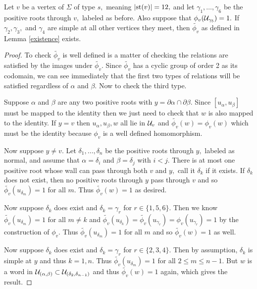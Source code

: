 \documentclass[class=book, crop=false]{standalone}
\begin{document}
	\begin{lemma} Let $v$ be a vertex of $\Sigma$ of type $s,$ meaning $|\mathrm{st}(v)|=12,$ and let $\gamma_1,\dots,\gamma_6$ be the positive roots through $v,$ labeled as before. Also suppose that $\phi_v(\mathcal{U}_{\gamma_5})=1.$ If $\gamma_2,\gamma_3,$ and $\gamma_4$ are simple at all other vertices they meet, then $\tilde{\phi_v}$ as defined in Lemma \ref{existence} exists.
	\label{336f2existence}
\end{lemma}
\begin{proof}
	To check $\tilde{\phi_v}$ is well defined is a matter of checking the relations are satisfied by the images under $\tilde{\phi_v}.$ Since $\tilde{\phi_v}$ has a cyclic group of order 2 as its codomain, we can see immediately that the first two types of relations will be satisfied regardless of $\alpha$ and $\beta.$ Now to check the third type.

	Suppose $\alpha$ and $\beta$ are any two positive roots with $y=\partial\alpha\cap \partial\beta.$ Since $[u_\alpha,u_\beta]$ must be mapped to the identity then we just need to check that $w$ is also mapped to the identity. If $y=v$ then $u_\alpha,u_\beta,w$ all lie in $\mathcal{U}_v$ and $\tilde{\phi_v}(w)=\phi_v(w)$ which must be the identity because $\phi_v$ is a well defined homomorphism.

	Now suppose $y\neq v.$ Let $\delta_1,\dots,\delta_n$ be the positive roots through $y,$ labeled as normal, and assume that $\alpha=\delta_i$ and $\beta=\delta_j$ with $i<j.$ There is at most one positive root whose wall can pass through both $v$ and $y,$ call it $\delta_k$ if it exists. If $\delta_k$ does not exist, then no positive roots through $y$ pass through $v$ and so $\tilde{\phi_v}(u_{\delta_m})=1$ for all $m.$ Thus $\tilde{\phi_v}(w)=1$ as desired.

	Now suppose $\delta_k$ does exist and $\delta_k=\gamma_r$ for $r\in \{1,5,6\}.$ Then we know $\tilde{\phi_v}(u_{\delta_m})=1$ for all  $m\neq k$ and $\tilde{\phi_v}(u_{\delta_k})=\tilde{\phi_v}(u_{\gamma_r})=\phi_v(u_{\gamma_r})=1$ by the construction of $\phi_v.$ Thus $\tilde{\phi_v}(u_{\delta_m})=1$ for all $m$ and so $\tilde{\phi_v}(w)=1$ as well.

	Now suppose $\delta_k$ does exist and $\delta_k=\gamma_r$ for $r\in \{2,3,4\}.$ Then by assumption, $\delta_k$ is simple at $y$ and thus $k=1,n.$ Thus $\tilde{\phi_v}(u_{\delta_m})=1$ for all $2\le m\le n-1.$ But $w$ is a word in $\mathcal{U}_{(\alpha,\beta)}\subset \mathcal{U}_{(\delta_2,\delta_{n-1})}$ and thus $\tilde{\phi_v}(w)=1$ again, which gives the result.
\end{proof}
\end{document}
